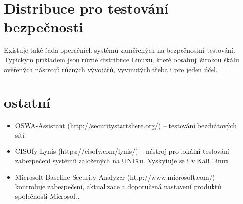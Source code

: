 \documentclass{article}
\begin{document}
\begin{large}
\section{Distribuce pro testování bezpečnosti}
Existuje také řada operačních systémů zaměřených
na bezpečnostní testování. Typickým příkladem jsou různé distribuce Linuxu, které obsahují
širokou škálu ověřených nástrojů různých vývojářů, vyvinutých třeba i pro jeden účel.

\section{ostatní}
\begin{itemize}
    \item OSWA-Assistant (http://securitystartshere.org/) – testování bezdrátových
sítí
\item CISOfy Lynis (https://cisofy.com/lynis/) – nástroj pro lokální testování zabezpečení
systémů založených na UNIXu. Vyskytuje se i v Kali Linux
\item Microsoft Baseline Security Analyzer (http://www.microsoft.com/) – kontroluje
zabezpečení, aktualizace a doporučená nastavení produktů společnosti Microsoft.
\end{itemize}
\end{large}
\end{document}
